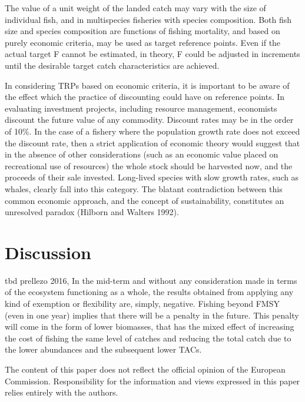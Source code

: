 \documentclass[12pt,oneline,a4paper,numbib]{ouparticle}
\numberwithin{equation}{subsection} %
\begin{document}
The value of a unit weight of the landed catch may vary with the size of individual fish, and in multispecies fisheries with species composition. Both fish size and species composition are functions of fishing mortality, and based on purely economic criteria, may be used as target reference points. Even if the actual target F cannot be estimated, in theory, F could be adjusted in increments until the desirable target catch characteristics are achieved.

In considering TRPs based on economic criteria, it is important to be aware of the effect which the practice of discounting could have on reference points. In evaluating investment projects, including resource management, economists discount the future value of any commodity. Discount rates may be in the order of 10\%. In the case of a fishery where the population growth rate does not exceed the discount rate, then a strict application of economic theory would suggest that in the absence of other considerations (such as an economic value placed on recreational use of resources) the whole stock should be harvested now, and the proceeds of their sale invested. Long-lived species with slow growth rates, such as whales, clearly fall into this category. The blatant contradiction between this common economic approach, and the concept of sustainability, constitutes an unresolved paradox (Hilborn and Walters 1992).

\newpage
\section{Discussion}
\label{sec4}
tbd
prellezo 2016, In the mid-term and without any consideration made in terms of the ecosystem functioning as a whole, the results obtained from applying any kind of exemption or flexibility are, simply, negative. Fishing beyond FMSY (even in one year) implies that there will be a penalty in the future. This penalty will come in the form of lower biomasses, that has the mixed effect of increasing the cost of fishing the same level of catches and reducing the total catch due to the lower abundances and the subsequent lower TACs.

\begin{notes}[Acknowledgements]
The content of this paper does not reflect the official opinion of the European Commission. Responsibility for the information and views expressed in this paper relies entirely with the authors.
\end{notes}

\newpage


\end{document}
